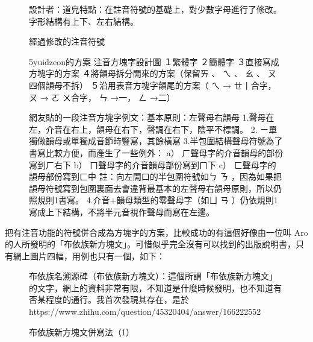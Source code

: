 \documentclass[a5paper, 12pt, openany]{book} %
\begin{document}
\begin{figure}[h]
\centering
\caption{設計者：道皃特點：在註音符號的基礎上，對少數字母進行了修改。字形結構有上下、左右結構。}
\label{fig:zhuyin_composed_2}
\end{figure}

\begin{figure}[h]
\centering
\caption{經過修改的注音符號}
\end{figure}


\begin{figure}[h]
\centering
\caption{5yuidzeon的方案 注音方塊字設計圖 １繁體字 ２簡體字 ３直接寫成方塊字的方案 ４將韻母拆分開來的方案（保留ㄞ 、 ㄟ 、 ㄠ 、 ㄡ四個韻母不拆） ５沿用表音方塊字韻尾的方案（ ㄟ → ㄝ丨合字， ㄡ → ㄛ ㄨ合字， ㄣ →一， ㄥ →二）}
\end{figure}


\begin{figure}[h]
\centering
\caption{網友貼的一段注音方塊字例文：基本原則：左聲母右韻母 1.聲母在左，介音在右上，韻母在右下，聲調在右下，陰平不標調。 2. ㄧ單獨做韻母或單獨成音節時豎寫，其餘橫寫 3.半包圍結構聲母符號為了書寫比較方便，而產生了一些例外： a） ㄏ聲母字的介音韻母的部份寫到ㄏ右下 b） ㄇ聲母字的介音韻母部份寫到ㄇ下 c） ㄈ聲母字的韻母部份寫到ㄈ中 註：向左開口的半包圍符號如ㄅ ㄋ ，因為如果把韻母符號寫到包圍裏面去會違背最基本的左聲母右韻母原則，所以仍照規則1書寫。 4.介音+韻母類型的零聲母字（如ㄩ ㄢ ）仍依規則1寫成上下結構，不將半元音視作聲母而寫在左邊。}
\end{figure}


把有注音功能的符號併合成為方塊字的方案，比較成功的有這個好像由一位叫 Aro 的人所發明的「布依族新方塊文」。可惜似乎完全沒有可以找到的出版說明書，只有網上圖片四幅，用例也只有一個，如下：

\begin{figure}[h]
\centering
\caption{布依族名溯源碑（布依族新方塊文）：這個所謂「布依族新方塊文」的文字，網上的資料非常有限，不知道是什麼時候發明，也不知道有否某程度的通行。我首次發現其存在，是於https://www.zhihu.com/question/45320404/answer/166222552}
\end{figure}

\begin{figure}[h]
\centering
\caption{布依族新方塊文併寫法（1）}
\end{figure}
\end{document}
